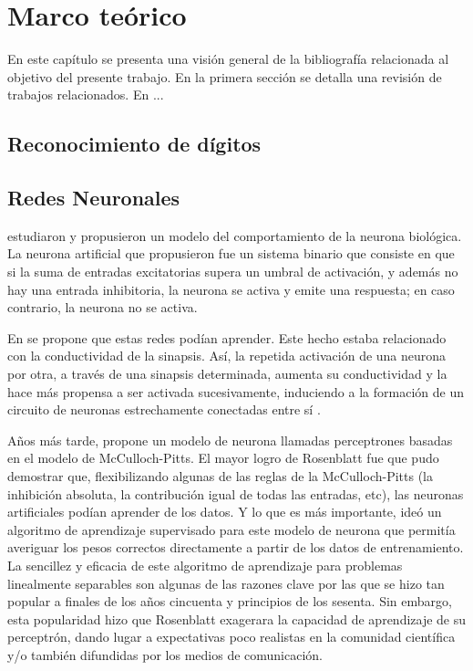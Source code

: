 \chapter{Marco te\'orico}
\label{Chapter2}

En este capítulo se presenta una visión general de la bibliografía relacionada al objetivo del presente trabajo. En la
primera sección se detalla una revisión de trabajos relacionados. En ... %

\section{Reconocimiento de d\'igitos}
\lipsum[1]

\section{Redes Neuronales}
\cite{mcculloch1943logical} estudiaron y propusieron un modelo del comportamiento de la
neurona biológica. La neurona artificial que propusieron fue un sistema binario que consiste en que si la suma de entradas excitatorias supera un umbral de activación, y además no
hay una entrada inhibitoria, la neurona se activa y emite una respuesta; en caso contrario, la neurona no se activa.

En \citeyear{hebb1949organization} se propone que estas redes podían aprender. Este hecho estaba relacionado con la
conductividad de la sinapsis. Así, la repetida activación de una neurona por otra, a través de una sinapsis
determinada, aumenta su conductividad y la hace más propensa a ser activada sucesivamente, induciendo a la formación de
un circuito de neuronas estrechamente conectadas entre sí \parencite{hebb1949organization}.

Años más tarde, \cite{rosenblatt1958perceptron} propone un modelo de neurona llamadas perceptrones basadas en el modelo
de McCulloch-Pitts. El mayor logro de Rosenblatt fue que pudo demostrar que, flexibilizando algunas de las reglas de la
McCulloch-Pitts (la inhibición absoluta, la contribución igual de todas las entradas, etc), las neuronas artificiales
podían aprender de los datos. Y lo que es más importante, ideó un algoritmo de aprendizaje supervisado para este modelo
de neurona que permitía averiguar los pesos correctos directamente a partir de los datos de entrenamiento. La sencillez
y eficacia de este algoritmo de aprendizaje para problemas linealmente separables son algunas de las razones clave por
las que se hizo tan popular a finales de los años cincuenta y principios de los sesenta. Sin embargo, esta popularidad
hizo que Rosenblatt exagerara la capacidad de aprendizaje de su perceptrón, dando lugar a expectativas poco realistas
en la comunidad científica y/o también difundidas por los medios de comunicación.

